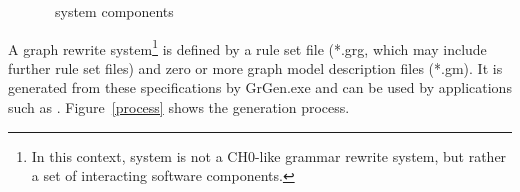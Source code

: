 \begin{figure}[htbp]
{
	}
  \caption{\GrG\ system components~\cite{Kro:07}}
  \label{figsys}
\end{figure}

A graph rewrite system\footnote{In this context, system is not a CH0-like grammar rewrite system, but rather a set of interacting software components.} 
is defined by a rule set file (*.grg, which may include further rule set files) and zero or more graph model description files (*.gm). 
It is generated from these specifications by GrGen.exe and can be used by applications such as \GrShell.
Figure~\ref{process} shows the generation process.

